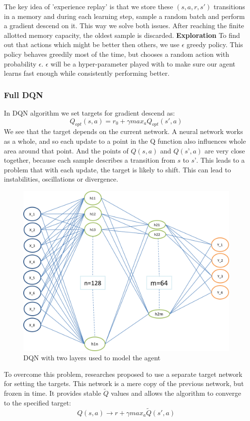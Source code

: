 The key idea of 'experience replay' is that we store these $(s, a, r, s')$ transitions in a memory and during each learning step, sample a random batch and perform a gradient descend on it. This way we solve both issues.
After reaching the finite allotted memory capacity, the oldest sample is discarded.
\newline \newline
\textbf{Exploration}
To find out that actions which might be better then others, we use $\epsilon$ greedy policy. This policy behaves greedily most of the time, but chooses a random action with probability $\epsilon$. $\epsilon$ will be a hyper-parameter played with to make sure our agent learns fast enough while consistently performing better.

\subsubsection{Full DQN}
In DQN algorithm we set targets for gradient descend as:
\begin{equation}
Q_{opt}(s,a) = r_{0} + \gamma max_{a}Q_{opt}(s',a)
\end{equation}
We see that the target depends on the current network. A neural network works as a whole, and so each update to a point in the Q function also influences whole area around that point. And the points of $Q(s, a)$ and $Q(s’, a)$ are very close together, because each sample describes a transition from $s$ to $s’$. This leads to a problem that with each update, the target is likely to shift. This can lead to instabilities, oscillations or divergence.
\newline
\begin{figure}[!ht]
\centering
\includegraphics[scale=0.35,width=0.35\columnwidth]{figures/NN.png}%
\caption{ DQN with two layers used to model the agent}%
\label{fig:Visualization}%
\end{figure}

To overcome this problem, researches proposed to use a separate target network for setting the targets. This network is a mere copy of the previous network, but frozen in time. It provides stable $\tilde{Q}$ values and allows the algorithm to converge to the specified target:
\begin{equation}
Q(s, a) \xrightarrow{} r + \gamma max_a \tilde{Q}(s', a)
\end{equation}

